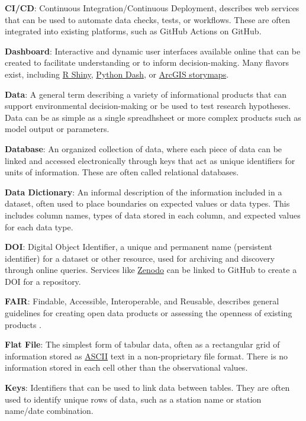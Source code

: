 \documentclass[
]{book}
\begin{document}
\textbf{CI/CD}: Continuous Integration/Continuous Deployment, describes web services that can be used to automate data checks, tests, or workflows. These are often integrated into existing platforms, such as GitHub Actions on GitHub.

\textbf{Dashboard}: Interactive and dynamic user interfaces available online that can be created to facilitate understanding or to inform decision-making. Many flavors exist, including \href{https://shiny.rstudio.com/}{R Shiny}, \href{https://dash.plotly.com/}{Python Dash}, or \href{https://www.esri.com/en-us/arcgis/products/arcgis-storymaps/overview}{ArcGIS storymaps}.

\textbf{Data}: A general term describing a variety of informational products that can support environmental decision-making or be used to test research hypotheses. Data can be as simple as a single spreadhsheet or more complex products such as model output or parameters.

\textbf{Database}: An organized collection of data, where each piece of data can be linked and accessed electronically through keys that act as unique identifiers for units of information. These are often called relational databases.

\textbf{Data Dictionary}: An informal description of the information included in a dataset, often used to place boundaries on expected values or data types. This includes column names, types of data stored in each column, and expected values for each data type.

\textbf{DOI}: Digital Object Identifier, a unique and permanent name (persistent identifier) for a dataset or other resource, used for archiving and discovery through online queries. Services like \href{https://zenodo.org/}{Zenodo} can be linked to GitHub to create a DOI for a repository.

\textbf{FAIR}: Findable, Accessible, Interoperable, and Reusable, describes general guidelines for creating open data products or assessing the openness of existing products \citep{Wilkinson16}.

\textbf{Flat File}: The simplest form of tabular data, often as a rectangular grid of information stored as \href{https://en.wikipedia.org/wiki/ASCII}{ASCII} text in a non-proprietary file format. There is no information stored in each cell other than the observational values.

\textbf{Keys}: Identifiers that can be used to link data between tables. They are often used to identify unique rows of data, such as a station name or station name/date combination.
\end{document}
